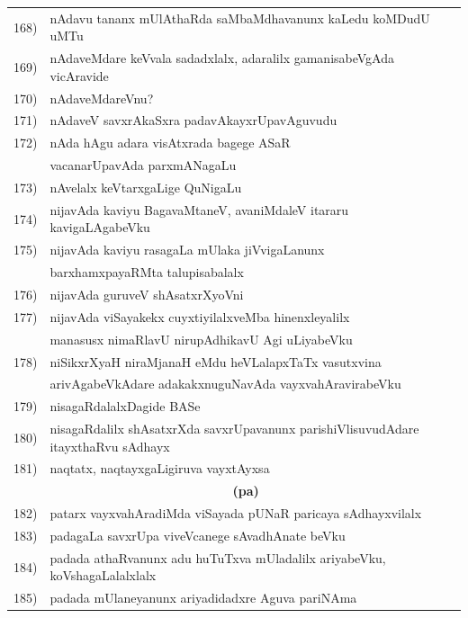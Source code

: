 \begin{longtable}{@{}cp{7.4cm}r}
168) & nAdavu tananx mUlAthaRda saMbaMdhavanunx kaLedu koMDudU uMTu & \pageref{page178}\\
169) & nAdaveMdare keVvala sadadxlalx, adaralilx gamanisabeVgAda vicAravide & \pageref{page169}\\
170) & nAdaveMdareVnu? & \pageref{page142a}\\
171) & nAdaveV savxrAkaSxra padavAkayxrUpavAguvudu & \pageref{page141b}\\
172) & nAda hAgu adara visAtxrada bagege ASaR & \\
     & vacanarUpavAda parxmANagaLu & \pageref{page144}\\
173) & nAvelalx keVtarxgaLige QuNigaLu & \pageref{page104b}\\
174) & nijavAda kaviyu BagavaMtaneV, avaniMdaleV itararu kavigaLAgabeVku & \pageref{page239}\\
175) & nijavAda kaviyu rasagaLa mUlaka jiVvigaLanunx  & \pageref{page183}\\
     & barxhamxpayaRMta talupisabalalx & \\
176) & nijavAda guruveV shAsatxrXyoVni & \pageref{page68}\\
177) & nijavAda viSayakekx cuyxtiyilalxveMba hinenxleyalilx & \\
     & manasusx nimaRlavU nirupAdhikavU Agi uLiyabeVku & \pageref{page250b}\\
178) & niSikxrXyaH niraMjanaH eMdu heVLalapxTaTx vasutxvina & \\
     & arivAgabeVkAdare adakakxnuguNavAda vayxvahAravirabeVku & \pageref{page202}\\
179) & nisagaRdalalxDagide BASe & \pageref{page6a}\\
180) & nisagaRdalilx shAsatxrXda savxrUpavanunx parishiVlisuvudAdare itayxthaRvu sAdhayx & \pageref{page249}\\
181) & naqtatx, naqtayxgaLigiruva vayxtAyxsa & \pageref{page242b}\\[0.3cm]
     &   \multicolumn{1}{c}{\textbf{(pa)}}  & \\[0.3cm]
182) & patarx vayxvahAradiMda viSayada pUNaR paricaya sAdhayxvilalx & \pageref{page30e}\\
183) & padagaLa savxrUpa viveVcanege sAvadhAnate beVku & \pageref{page191}\\
184) & padada athaRvanunx adu huTuTxva mUladalilx ariyabeVku, koVshagaLalalxlalx & \pageref{page202}\\ 
185) & padada mUlaneyanunx ariyadidadxre Aguva pariNAma & \pageref{page186c}\\

\end{longtable}
